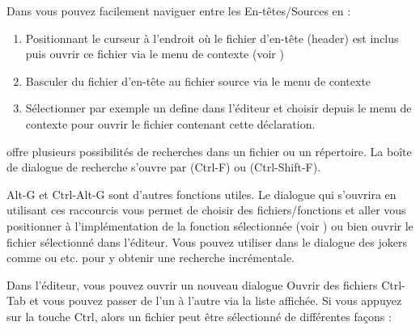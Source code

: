
Dans \codeblocks vous pouvez facilement naviguer entre les En-têtes/Sources en :

\begin{enumerate}
\item Positionnant le curseur à l'endroit où le fichier d'en-tête (header) est inclus puis ouvrir ce fichier via le menu de contexte  (voir )
\item Basculer du fichier d'en-tête au fichier source via le menu de contexte 
\item Sélectionner par exemple un define dans l'éditeur et choisir  depuis le menu de contexte pour ouvrir le fichier contenant cette déclaration.
\end{enumerate}


\codeblocks offre plusieurs possibilités de recherches dans un fichier ou un répertoire. La boîte de dialogue de recherche s'ouvre par  (Ctrl-F) ou  (Ctrl-Shift-F).

Alt-G et Ctrl-Alt-G sont d'autres fonctions utiles. Le dialogue qui s'ouvrira en utilisant ces raccourcis vous permet de choisir des fichiers/fonctions et aller vous positionner à l'implémentation de la fonction sélectionnée (voir ) ou bien ouvrir le fichier sélectionné dans l'éditeur. Vous pouvez utiliser dans le dialogue des jokers comme \codeline{*} ou  etc. pour y obtenir une recherche incrémentale.



Dans l'éditeur, vous pouvez ouvrir un nouveau dialogue Ouvrir des fichiers Ctrl-Tab et vous pouvez passer de l'un à l'autre via la liste affichée. Si vous appuyez sur la touche Ctrl, alors un fichier peut être sélectionné de différentes façons :

